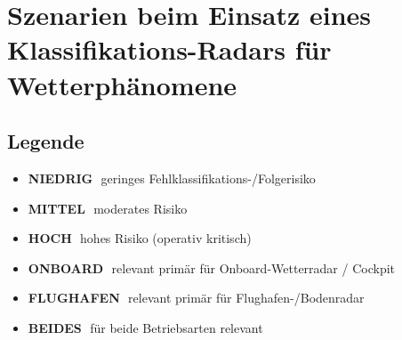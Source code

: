 \section{Szenarien beim Einsatz eines Klassifikations-Radars für Wetterphänomene}


\newcommand{\riskbadge}[2]{\colorbox{#1!15}{\textcolor{#1!70!black}{\scriptsize\textbf{#2}}}}
\newcommand{\risklow}{\riskbadge{green}{NIEDRIG}}
\newcommand{\riskmed}{\riskbadge{orange}{MITTEL}}
\newcommand{\riskhigh}{\riskbadge{red}{HOCH}}
\newcommand{\scopeon}{\colorbox{cyan!15}{\textcolor{cyan!60!black}{\scriptsize\textbf{ONBOARD}}}}
\newcommand{\scopeapt}{\colorbox{violet!15}{\textcolor{violet!60!black}{\scriptsize\textbf{FLUGHAFEN}}}}
\newcommand{\scopeboth}{\colorbox{gray!20}{\textcolor{black!70}{\scriptsize\textbf{BEIDES}}}}

\subsection*{Legende}
\begin{itemize}[leftmargin=2.2em,itemsep=0.2em]
  \item \risklow\ \,geringes Fehlklassifikations-/Folgerisiko
  \item \riskmed\ \,moderates Risiko
  \item \riskhigh\ \,hohes Risiko (operativ kritisch)
  \item \scopeon\ \,relevant primär für Onboard-Wetterradar / Cockpit
  \item \scopeapt\ \,relevant primär für Flughafen-/Bodenradar
  \item \scopeboth\ \,für beide Betriebsarten relevant
\end{itemize}

